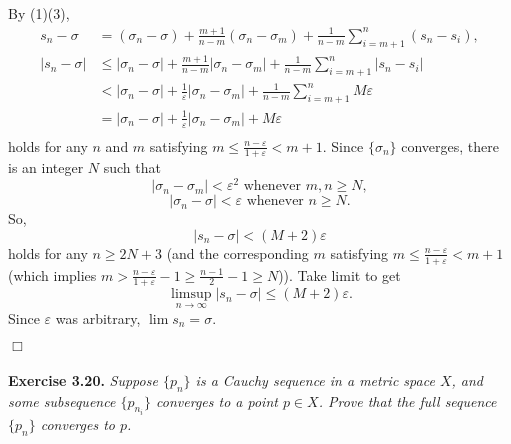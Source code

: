 \documentclass{article}
\begin{document}
\begin{enumerate}
By (1)(3),
  \begin{align*}
  s_n - \sigma
  &=
  (\sigma_n - \sigma)
    + \frac{m+1}{n-m}(\sigma_n - \sigma_m)
    + \frac{1}{n-m}\sum_{i=m+1}^{n}(s_n - s_i), \\
  |s_n - \sigma|
  &\leq
  |\sigma_n - \sigma|
    + \frac{m+1}{n-m}|\sigma_n - \sigma_m|
    + \frac{1}{n-m}\sum_{i=m+1}^{n}|s_n - s_i| \\
  &<
  |\sigma_n - \sigma|
    + \frac{1}{\varepsilon} |\sigma_n - \sigma_m|
    + \frac{1}{n-m}\sum_{i=m+1}^{n} M\varepsilon \\
  &=
  |\sigma_n - \sigma|
    + \frac{1}{\varepsilon} |\sigma_n - \sigma_m|
    + M\varepsilon \\
  \end{align*}
holds for any $n$ and $m$ satisfying
$m \leq \frac{n-\varepsilon}{1+\varepsilon} < m+1.$
Since $\{ \sigma_n \}$ converges,
there is an integer $N$ such that
$$|\sigma_n - \sigma_m| < \varepsilon^2 \text{ whenever } m,n \geq N,$$
$$|\sigma_n - \sigma| < \varepsilon \text{ whenever } n \geq N.$$
So,
$$|s_n - \sigma| < (M+2) \varepsilon$$
holds for any $n \geq 2N+3$ (and the corresponding $m$
satisfying $m \leq \frac{n-\varepsilon}{1+\varepsilon} < m+1$
(which implies $m > \frac{n-\varepsilon}{1+\varepsilon} - 1
\geq \frac{n-1}{2} - 1 \geq N$)).
Take limit to get
$$\limsup_{n \to \infty} |s_n - \sigma| \leq (M+2) \varepsilon.$$
Since $\varepsilon$ was arbitrary, $\lim s_n = \sigma$.
\end{enumerate}
$\Box$ \\\\






\textbf{Exercise 3.20.}
\emph{Suppose $\{p_n\}$ is a Cauchy sequence in a metric space $X$,
and some subsequence $\{p_{n_i}\}$ converges to a point $p \in X$.
Prove that the full sequence $\{p_n\}$ converges to $p$. } \\
\end{document}
